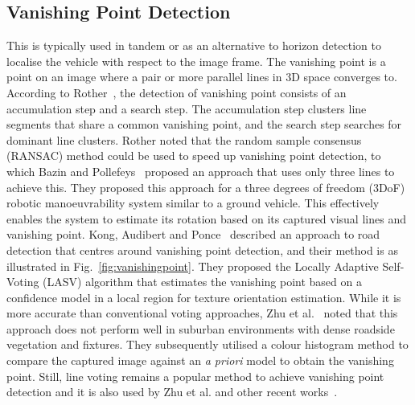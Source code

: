 \subsection{Vanishing Point Detection} \label{secvanishing}
This is typically used in tandem or as an alternative to horizon detection to localise the vehicle with respect to the image frame. The vanishing point is a point on an image where a pair or more parallel lines in 3D space converges to. According to Rother~\cite{rother_new_2002}, the detection of vanishing point consists of an accumulation step and a search step. The accumulation step clusters line segments that share a common vanishing point, and the search step searches for dominant line clusters. Rother noted that the random sample consensus (RANSAC) method could be used to speed up vanishing point detection, to which Bazin and Pollefeys~\cite{j._c._bazin_3-line_2012}  proposed an approach that uses only three lines to achieve this. They proposed this approach for a three degrees of freedom (3DoF) robotic manoeuvrability system similar to a ground vehicle. This effectively enables the system to estimate its rotation based on its captured visual lines and vanishing point. Kong, Audibert and Ponce~\cite{h._kong_general_2010} described an approach to road detection that centres around vanishing point detection, and their method is as illustrated in Fig.~\ref{fig:vanishingpoint}. They proposed the Locally Adaptive Self-Voting (LASV) algorithm that estimates the vanishing point based on a confidence model in a local region for texture orientation estimation. While it is more accurate than conventional voting approaches, Zhu et al.~\cite{zhu_visual_2014} noted that this approach does not perform well in suburban environments with dense roadside vegetation and fixtures. They subsequently utilised a colour histogram method to compare the captured image against an \textit{a priori} model to obtain the vanishing point. Still, line voting remains a popular method to achieve vanishing point detection and it is also used by Zhu et al. and other recent works~\cite{wu_novel_2016, alvarez_combining_2014, ricaud_general_2014, t._h._bui_local_2012, p._moghadam_fast_2012}. 



